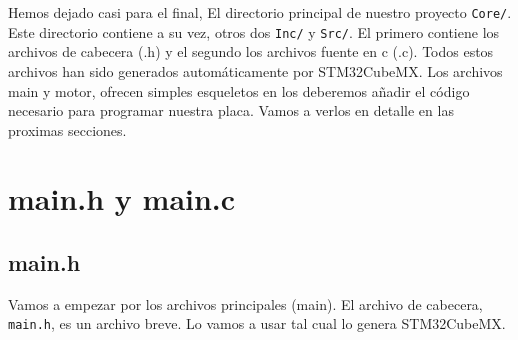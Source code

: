 Hemos dejado casi para el final, El directorio principal de nuestro proyecto \texttt{Core/}. Este directorio contiene a su vez, otros dos \texttt{Inc/} y \texttt{Src/}. El primero contiene los archivos de cabecera (.h) y el segundo los archivos fuente en c (.c). Todos estos archivos han sido generados automáticamente por STM32CubeMX. Los archivos main y motor, ofrecen simples esqueletos en los deberemos añadir el código necesario para programar nuestra placa. Vamos a verlos en detalle en las proximas secciones.

\section{main.h y main.c}
\subsection{main.h} 
Vamos a empezar por los archivos principales (main). El archivo de cabecera, \texttt{main.h}, es un archivo breve. Lo vamos a usar tal cual lo genera STM32CubeMX.

